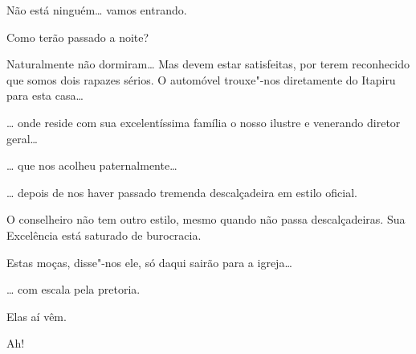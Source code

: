  Não está ninguém\ldots{} vamos entrando. 

 Como terão passado a noite?

 Naturalmente não dormiram\ldots{} Mas devem estar satisfeitas, por
terem reconhecido que somos dois rapazes sérios. O automóvel trouxe"-nos
diretamente do Itapiru para esta casa\ldots{}

 \ldots{} onde reside com sua excelentíssima
família o nosso ilustre e venerando diretor geral\ldots{}

 \ldots{} que nos acolheu paternalmente\ldots{}

 \ldots{} depois de nos haver passado tremenda descalçadeira em
estilo oficial.

 O conselheiro não tem outro estilo, mesmo quando não passa
descalçadeiras. Sua Excelência está saturado de burocracia.

 Estas moças, disse"-nos ele, só daqui sairão para a igreja\ldots{}

 \ldots{} com escala pela pretoria.

 Elas aí vêm.

 Ah!


